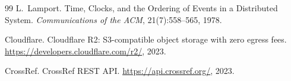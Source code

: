 \documentclass[11pt,a4paper]{article}
\theoremstyle{plain}
\theoremstyle{definition}
\theoremstyle{remark}
\begin{document}
\begin{thebibliography}{99}
L.~Lamport.
\newblock Time, Clocks, and the Ordering of Events in a Distributed System.
\newblock \emph{Communications of the ACM}, 21(7):558--565, 1978.

Cloudflare.
\newblock Cloudflare R2: S3-compatible object storage with zero egress fees.
\newblock \url{https://developers.cloudflare.com/r2/}, 2023.

CrossRef.
\newblock CrossRef REST API.
\newblock \url{https://api.crossref.org/}, 2023.

\end{thebibliography}
\end{document}
